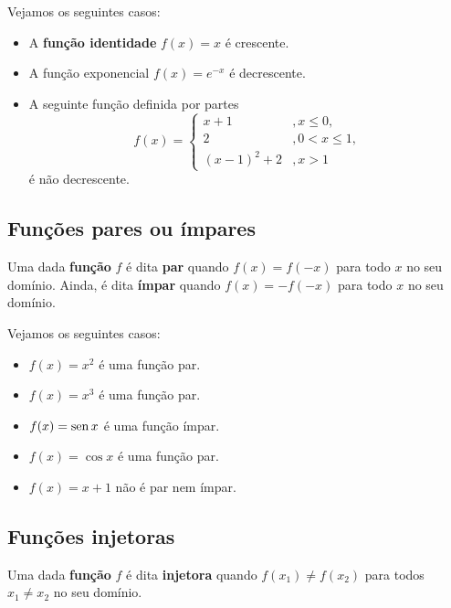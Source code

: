 \begin{ex}
  Vejamos os seguintes casos:
  \begin{itemize}
  \item A {\bf função identidade} $f(x)=x$ é crescente.
  \item A função exponencial $f(x)=e^{-x}$ é decrescente.
  \item A seguinte função definida por partes
    \begin{equation}
      f(x) = \left\{
        \begin{array}{ll}
          x+1 &,x\leq 0,\\
          2 &,0<x\leq 1,\\
          (x-1)^2+2 &, x>1
        \end{array}
\right.
\end{equation}
é não decrescente.
  \end{itemize}
\end{ex}

\subsection{Funções pares ou ímpares}

Uma dada {\bf função} $f$ é dita {\bf par} quando $f(x)=f(-x)$ para todo $x$ no seu domínio. Ainda, é dita {\bf ímpar} quando $f(x)=-f(-x)$ para todo $x$ no seu domínio.

\begin{ex}
  Vejamos os seguintes casos:
  \begin{itemize}
  \item $f(x) = x^2$ é uma função par.
  \item $f(x) = x^3$ é uma função par.
  \item $f(x) = \operatorname{sen} x$ é uma função ímpar.
  \item $f(x) = \cos x$ é uma função par.
  \item $f(x) = x+1$ não é par nem ímpar.
  \end{itemize}
\end{ex}

\subsection{Funções injetoras}

Uma dada {\bf função} $f$ é dita {\bf injetora} quando $f(x_1)\neq f(x_2)$ para todos $x_1\neq x_2$ no seu domínio.

